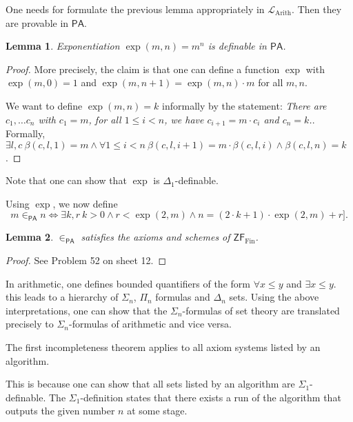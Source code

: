 \documentclass[a4paper, 11pt]{amsart}
\newtheorem{lemma}[lemma]{Lemma}
\theoremstyle{remark}
\newcommand{\axiomft}[1]{\mathsf{#1}}
\newcommand{\PA}{\axiomft{PA}}
\newcommand{\ZF}{\axiomft{ZF}}
\newcommand{\Fin}{\mathrm{Fin}}
\newcommand{\cL}{\mathcal L}
\begin{document}
One needs for formulate the previous lemma appropriately in $\cL_{\mathrm{Arith}}$. 
Then they are provable in $\PA$. 

\begin{lemma} 
Exponentiation $\exp(m,n)=m^n$ is definable in $\PA$. 
\end{lemma} 
\begin{proof} 
More precisely, the claim is that one can define a function $\exp$ with $\exp(m,0)=1$ and $\exp(m,n+1)=\exp(m,n)\cdot m$ for all $m,n$. 

We want to define $\exp(m,n)=k$ informally by the statement: 
\emph{There are $c_1,\dots c_n$ with $c_1=m$, for all $1\leq i<n$, we have $c_{i+1} = m\cdot c_i$ and $c_n=k$.}. 
Formally, $\exists l,c\ \beta(c,l,1)=m \wedge \forall 1\leq i<n\ \beta(c,l,i+1) = m\cdot \beta(c,l,i) \wedge \beta(c,l,n)=k$. 
\end{proof} 

Note that one can show that $\exp$ is $\Delta_1$-definable. 

Using $\exp$, we now define 
$$m \in_\PA n \Leftrightarrow\exists k,r\ k>0 \wedge r<\exp(2,m) \wedge n= (2\cdot k +1 ) \cdot \exp(2,m) + r].$$ 

\begin{lemma} 
$\in_\PA$ satisfies the axioms and schemes of $\ZF_\Fin$. 
\end{lemma} 
\begin{proof} 
See Problem 52 on sheet 12. 
\end{proof} 

In arithmetic, one defines bounded quantifiers of the form $\forall x\leq y$ and $\exists x\leq y$. 
this leads to a hierarchy of $\Sigma_n$, $\Pi_n$ formulas and $\Delta_n$ sets. 
Using the above interpretations, one can show that the $\Sigma_n$-formulas of set theory are translated precisely to $\Sigma_n$-formulas of arithmetic and vice versa. 





The first incompleteness theorem applies to all axiom systems listed by an algorithm. 

This is because one can show that all sets listed by an algorithm are $\Sigma_1$-definable. 
The $\Sigma_1$-definition states that there exists a run of the algorithm that outputs the given number $n$ at some stage. 
\end{document}
